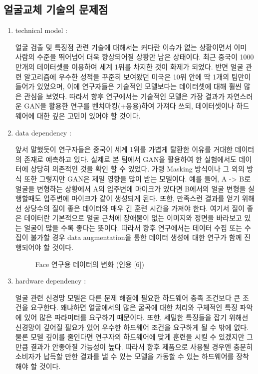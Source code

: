 \subsection{얼굴교체 기술의 문제점}
\begin{enumerate}
    \item technical model : 

    얼굴 검출 및 특징점 관련 기술에 대해서는 커다란 이슈가 없는 상황이면서 이미 사람의 수준을 뛰어넘어 더욱 향상되어질 상황만 남은 상태이다. 최근 중국이 1000만개의 데이터셋을 이용하여 세계 1위를 차지한 것이 화제가 되었다. 반면 얼굴 관련 알고리즘에 우수한 성적을 꾸준히 보여왔던 미국은 10위 안에 딱 1개의 팀만이 들어가 있었으며, 이에 연구자들은 기술적인 모델보다는 데이터셋에 대해 훨씬 많은 관심을 보였다. 따라서 향후 연구에서는 기술적인 모델은 가장 결과가 자연스러운 GAN을 활용한 연구를 벤치마킹(+응용)하여 가져다 쓰되, 데이터셋이나 하드웨어에 대한 깊은 고민이 있어야 할 것이다.

    \item data dependency : 

    앞서 말했듯이 연구자들은 중국이 세계 1위를 가볍게 탈환한 이유를 거대한 데이터의 존재로 예측하고 있다. 실제로 본 팀에서 GAN을 활용하여 한 실험에서도 데이터에 상당히 의존적인 것을 확인 할 수 있었다. 가령 Masking 방식이나 그 외의 방식 또한 그렇지만 GAN은 제일 영향을 많이 받는 모델이다. 예를 들어, A -> B로 얼굴을 변형하는 상황에서 A의 입주변에 마이크가 있다면 B에서의 얼굴 변형을 실행할때도 입주변에 마이크가 같이 생성되게 된다. 또한, 만족스런 결과를 얻기 위해선 상당수의 질이 좋은 데이터와 매우 긴 훈련 시간을 가져야 한다. 여기서 질이 좋은 데이터란 기본적으로 얼굴 근처에 장애물이 없는 이미지와 정면을 바라보고 있는 얼굴이 많을 수록 좋다는 뜻이다. 따라서 향후 연구에서는 데이터 수집 또는 수집이 불가할 경우 data augmentation을 통한 데이터 생성에 대한 연구가 함께 진행되어야 할 것이다.

    \begin{figure}[h!]
        \centering
    \caption{Face 연구용 데이터의 변화 (인용 [6])}
    \end{figure}

    \item hardware dependency : 

    얼굴 관련 신경망 모델은 다른 문제 해결에 필요한 하드웨어 충족 조건보다 큰 조건을 요구한다. 왜냐하면 얼굴에서의 많은 굴곡에 대한 처리와 구체적인 특징 파악에 있어 많은 파라미터를 요구하기 때문이다. 또한, 세밀한 특징들을 잡기 위해선 신경망이 깊어질 필요가 있어 우수한 하드웨어 조건을 요구하게 될 수 밖에 없다. 물론 모델 깊이를 줄인다면 연구자의 하드웨어에 맞게 훈련을 시킬 수 있겠지만 그만큼 결과가 안좋아질 가능성이 높다. 따라서 향후 제품으로 사용될 경우엔 충분히 소비자가 납득할 만한 결과를 낼 수 있는 모델을 가동할 수 있는 하드웨어를 장착해야 할 것이다. 


\end{enumerate}
